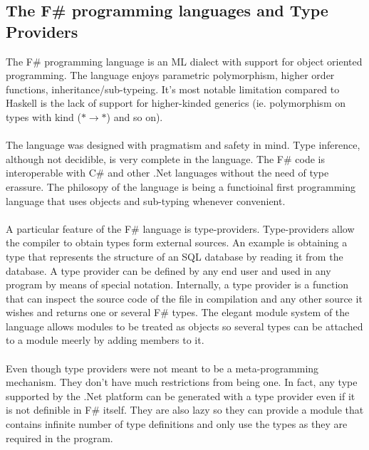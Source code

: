 \documentclass[8pt]{extarticle}
\begin{document}
\subsection{The F\# programming languages and Type Providers}
The F\#\cite{FSharp} programming language is an ML dialect with support for object oriented programming. The language enjoys parametric polymorphism, higher order functions, inheritance/sub-typeing. It's most notable limitation compared to Haskell is the lack of support for higher-kinded generics (ie. polymorphism on types with kind ($*\to *$) and so on).
\\\\
The language was designed with pragmatism and safety in mind. Type inference, although not decidible, is very complete in the language. The F\# code is interoperable with C\# and other .Net languages without the need of type erassure. The philosopy of the language is being a functioinal first programming language that uses objects and sub-typing whenever convenient.
\\\\
A particular feature of the F\# language is type-providers\cite{TypeProviders}. Type-providers allow the compiler to obtain types form external sources. An example is obtaining a type that represents the structure of an SQL database by reading it from the database. A type provider can be defined by any end user and used in any program by means of special notation. Internally, a type provider is a function that can inspect the source code of the file in compilation and any other source it wishes and returns one or several F\# types. The elegant module system of the language allows modules to be treated as objects so several types can be attached to a module meerly by adding members to it.
\\\\
Even though type providers were not meant to be a meta-programming mechanism. They don't have much restrictions from being one. In fact, any type supported by the .Net platform can be generated with a type provider even if it is not definible in F\# itself. They are also lazy so they can provide a module that contains infinite number of type definitions and only use the types as they are required in the program.
\end{document}

